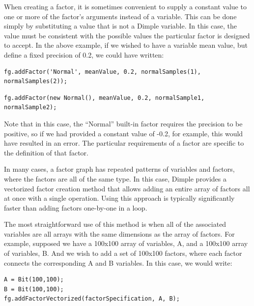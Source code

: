 When creating a factor, it is sometimes convenient to supply a constant value to one or more of the factor's arguments instead of a variable.  This can be done simply by substituting a value that is not a Dimple variable.  In this case, the value must be consistent with the possible values the particular factor is designed to accept.  In the above example, if we wished to have a variable mean value, but define a fixed precision of 0.2, we could have written:

\ifmatlab

\begin{lstlisting}
fg.addFactor('Normal', meanValue, 0.2, normalSamples(1), normalSamples(2));
\end{lstlisting}

\fi

\ifjava
\begin{lstlisting}
fg.addFactor(new Normal(), meanValue, 0.2, normalSample1, normalSample2);
\end{lstlisting}

\fi

Note that in this case, the ``Normal'' built-in factor requires the precision to be positive, so if we had provided a constant value of -0.2, for example, this would have resulted in an error.  The particular requirements of a factor are specific to the definition of that factor.

\ifmatlab

\label{sec:vectorizedFactorCreation}

In many cases, a factor graph has repeated patterns of variables and factors, where the factors are all of the same type.  In this case, Dimple provides a vectorized factor creation method that allows adding an entire array of factors all at once with a single operation.  Using this approach is typically significantly faster than adding factors one-by-one in a loop.

The most straightforward use of this method is when all of the associated variables are all arrays with the same dimensions as the array of factors.  For example, supposed we have a 100x100 array of variables, A, and a 100x100 array of variables, B.  And we wish to add a set of 100x100 factors, where each factor connects the corresponding A and B variables.  In this case, we would write:

\begin{lstlisting}
A = Bit(100,100);
B = Bit(100,100);
fg.addFactorVectorized(factorSpecification, A, B);
\end{lstlisting}

